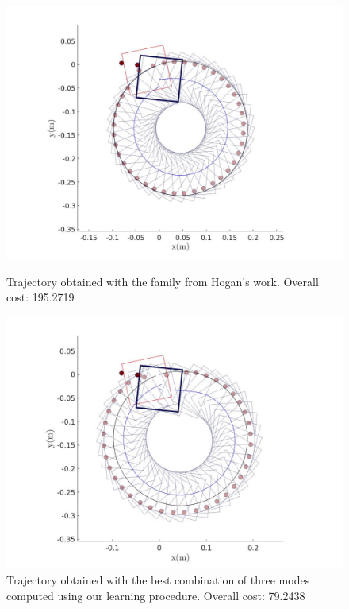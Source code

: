 \documentclass[12,twoside]{TFG-GM}
\theoremstyle{definition}
\theoremstyle{remark}
\begin{document}
\begin{figure}
    \centering
    \begin{minipage}{0.5\textwidth}
        \centering
        \includegraphics[width=1\textwidth]{frank_modes_circle_internal.jpg} %
        \caption{Trajectory obtained with the family from Hogan's work. Overall cost: 195.2719}
    \end{minipage}\hfill
    \begin{minipage}{0.5\textwidth}
        \centering
        \includegraphics[width=1\textwidth]{best_3_modes_circle_interior.jpg} %
        \caption{Trajectory obtained with the best combination of three modes computed using our learning procedure. Overall cost: 79.2438}
    \end{minipage}
\end{figure}
\end{document}
